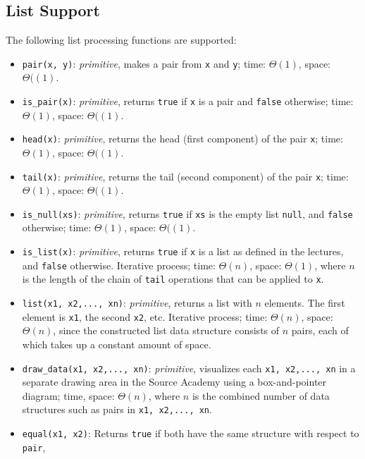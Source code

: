 \subsection*{List Support}

The following list processing functions are supported:

\begin{itemize}
\item \lstinline{pair(x, y)}: \textit{primitive}, makes a pair from \lstinline{x} and \lstinline{y}; time: $\Theta(1)$, space: $\Theta((1)$.
\item \lstinline{is_pair(x)}: \textit{primitive}, returns \lstinline{true} if \lstinline{x} is a
  pair and \lstinline{false} otherwise; time: $\Theta(1)$, space: $\Theta((1)$.
\item \lstinline{head(x)}: \textit{primitive}, returns the head (first component) of the pair \lstinline{x}; time: $\Theta(1)$, space: $\Theta((1)$.
\item \lstinline{tail(x)}: \textit{primitive}, returns the tail (second component) of the
  pair \lstinline{x}; time: $\Theta(1)$, space: $\Theta((1)$.
\item \lstinline{is_null(xs)}: \textit{primitive}, returns \lstinline{true} if \lstinline{xs} is the
  empty list \lstinline{null}, and \lstinline{false} otherwise; time: $\Theta(1)$, space: $\Theta((1)$.
\item \lstinline{is_list(x)}: \textit{primitive}, returns \lstinline{true} if
  \lstinline{x} is a list as defined in the lectures, and
  \lstinline{false} otherwise. Iterative process; 
time: $Θ(n)$, space: $Θ(1)$, where $n$ is the length of the 
chain of \lstinline{tail} operations that can be applied to \lstinline{x}.
\item \lstinline{list(x1, x2,..., xn)}: \textit{primitive}, returns a list with $n$ elements. The
first element is \lstinline{x1}, the second \lstinline{x2}, etc. Iterative
process; time: $Θ(n)$, space: $Θ(n)$, since the constructed list data structure
consists of $n$ pairs, each of which takes up a constant amount of space.
\item \lstinline{draw_data(x1, x2,..., xn)}: \textit{primitive}, visualizes each \lstinline{x1, x2,..., xn} in a separate drawing
  area in the Source Academy using a box-and-pointer diagram; time, space:
  $Θ(n)$, where $n$ is the combined number of data structures such as
  pairs in \lstinline{x1, x2,..., xn}.
\item \lstinline{equal(x1, x2)}: Returns \lstinline{true} if both
  have the same structure with respect to \lstinline{pair},

\end{itemize}
